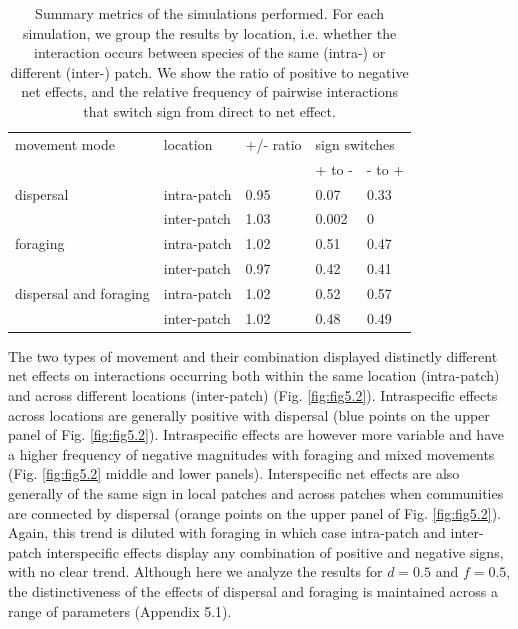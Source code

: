 \begin{table}[h]
\centering
\caption[Spatial effects summary metrics]{\color{Gray} Summary metrics of the simulations performed. For each simulation, we group the results by location, i.e. whether the interaction occurs between species of the same (intra-) or different (inter-) patch. We show the ratio of positive to negative net effects, and the relative frequency of pairwise interactions that switch sign from direct to net effect.}\label{tab:tab5.1}
\begin{tabular}{lllll}
\hline
movement mode          & location & +/- ratio & \multicolumn{2}{l}{sign switches} \\
\cline{4-5}

                       &          &           & + to -          & - to +          \\
\hline
dispersal              & intra-patch   & 0.95      & 0.07            & 0.33            \\
					  & inter-patch   & 1.03      & 0.002           & 0               \\

\hline
foraging               & intra-patch   & 1.02      & 0.51            & 0.47            \\
                       & inter-patch   & 0.97      & 0.42            & 0.41            \\

\hline
dispersal and foraging & intra-patch   & 1.02      & 0.52            & 0.57 \\
                       & inter-patch   & 1.02      & 0.48            & 0.49            \\

\end{tabular}

\end{table}

The two types of movement and their combination displayed distinctly different net effects on interactions occurring both within the same location (intra-patch) and across different locations (inter-patch) (Fig. \ref{fig:fig5.2}). Intraspecific effects across locations are generally positive with dispersal (blue points on the upper panel of Fig. \ref{fig:fig5.2}). Intraspecific effects are however more variable and have a higher frequency of negative magnitudes with foraging and mixed movements (Fig. \ref{fig:fig5.2} middle and lower panels). Interspecific net effects are also generally of the same sign in local patches and across patches when communities are connected by dispersal (orange points on the upper panel of Fig. \ref{fig:fig5.2}). Again, this trend is diluted with foraging in which case intra-patch and inter-patch interspecific effects display any combination of positive and negative signs, with no clear trend. Although here we analyze the results for $d = 0.5$ and $f = 0.5$, the distinctiveness of the effects of dispersal and foraging is maintained across a range of parameters (Appendix 5.1).

